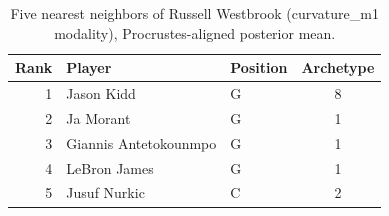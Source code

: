 \begin{table}[htbp]
  \centering\small
  \begin{tabular}{rllc}
    \toprule
    Rank & Player & Position & Archetype \\
    \midrule
    1 & Jason Kidd & G & 8 \\
    2 & Ja Morant & G & 1 \\
    3 & Giannis Antetokounmpo & G & 1 \\
    4 & LeBron James & G & 1 \\
    5 & Jusuf Nurkic & C & 2 \\
    \bottomrule
  \end{tabular}
  \caption{Five nearest neighbors of Russell Westbrook (curvature_m1 modality), Procrustes-aligned posterior mean.}
  \label{tab:Russell_Westbrook_neighbors_curvature_m1}
\end{table}

